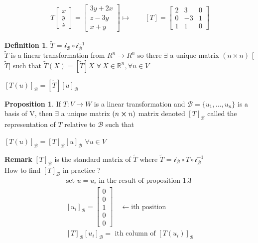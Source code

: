 \documentclass[
12pt,
]{article}
\newcommand{\tvw}{T : V\xrightarrow{} W }
\newcommand{\ttt}{\widetilde{T}}
\theoremstyle{definition}
\theoremstyle{definition}
\theoremstyle{definition}
\newtheorem{Definition}{Definition}[section]
\theoremstyle{definition}
\newtheorem{Proposition}{Proposition}[section]
\begin{document}
\begin{align*}
    T
    \begin{bmatrix}
    x \\
    y \\
    z 
    \end{bmatrix}=
    \begin{bmatrix}
    3y + 2x \\
    z - 3y \\
    x + y 
    \end{bmatrix}
    \longmapsto 
    \quad\quad[T]=
    \begin{bmatrix}
    2 & 3 & 0 \\
    0 & -3 & 1 \\
    1 & 1 & 0
    \end{bmatrix}
\end{align*}
\begin{Definition}
$\ttt$ = $\mathcal{i}_\mathcal{B} \circ \mathcal{i}_\mathcal{B}^{-1} $\\
$\ttt$ is a linear transformation from $R^{n}\xrightarrow{} R^{n} $ so there $\exists$ a unique matrix $(n\times n)$ [$\ttt$] such that $\ttt(X)= [\ttt]X$ \quad $\forall \ X \in \mathbb{R}^{n}, \forall u \in V $
\end{Definition}
\begin{center}
    $\boxed{[T(u)]_{\mathcal{B}} = [\ttt][u]_\mathcal{B}}$
\end{center}
\begin{Proposition}
    If $ \tvw $ is  a linear transformation and $\mathcal{B} = \{u_1,...,u_n\}$ is a basis of V, then $\exists$ a unique matrix $(n\cross n)$ matrix denoted $[T]_\mathcal{B}$ called the representation of $T$ relative to $\mathcal{B}$ such that \\
    \begin{center}
        $[T(u)]_\mathcal{B} = [T]_\mathcal{B}[u]_\mathcal{B}$ \quad $\forall u \in V$     
    \end{center}
\end{Proposition}
\textbf{Remark}
$[T]_\mathcal{B}$ is the standard matrix of $\ttt$ where $\ttt$ =  $\mathcal{i}_\mathcal{B} \circ T \circ \mathcal{i}_\mathcal{B}^{-1}$ \\ How to find $[T]_\mathcal{B}$ in practice ? 
\begin{align*}
    \text{set } u=u_i \text{ in the result of proposition 1.3} \\
    [u_i]_\mathcal{B} = 
    \begin{bmatrix}
    0 \\
    0 \\
    1 \\
    0 \\
    0
    \end{bmatrix}
    \quad \xleftarrow  \quad \text{ith position}\\
    [T]_\mathcal{B}[u_i]_\mathcal{B} = \text{ ith column of } [T(u_i)]_\mathcal{B}
\end{align*}
\end{document}
